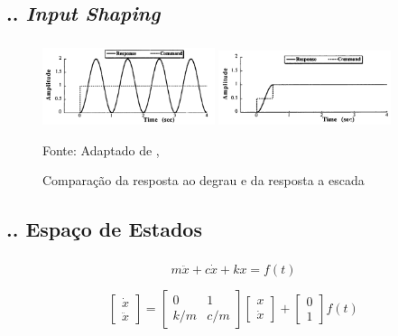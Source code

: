 \documentclass[aspectratio=169]{beamer}
\begin{document}
\subsection{\insertsectionnumber .\insertsubsectionnumber . \textit{Input Shaping}}
\begin{frame}
  \frametitle{\insertsubsection}
  \begin{figure}[H]
    \centering
    \caption{Comparação da resposta ao degrau e da resposta a escada}
    \includegraphics[width=0.45\textwidth]{inputshaperstepresponse1order}
    \includegraphics[width=0.45\textwidth]{inputshaperstarcasepresponse}

    {\footnotesize Fonte: Adaptado de \citeauthor{singhose97}, \citeyear{singhose97}}
    \label{fig:degr_vs_esc}
  \end{figure}
\end{frame}


\subsection{\insertsectionnumber .\insertsubsectionnumber . Espaço de Estados}

\begin{frame}
  \frametitle{\insertsubsection}

    \begin{equation}
      \label{eq:edo_ex}
      m \ddot x+c \dot x+kx = f(t)
  \end{equation}

  \begin{equation}
      \label{eq:espaco_de_estados_ex}
      \begin{bmatrix}
          \dot x \\
          \ddot x
      \end{bmatrix}
      =
      \begin{bmatrix}
          0 & 1 \\
          k/m & c/m
      \end{bmatrix}
      \begin{bmatrix}
          x \\
          \dot x
      \end{bmatrix}
      +
      \begin{bmatrix}
          0 \\
          1
      \end{bmatrix}
      f(t)
  \end{equation}
\end{frame}
\end{document}

